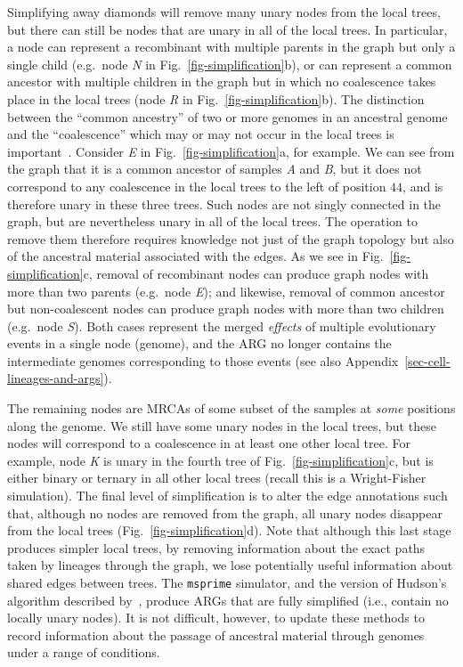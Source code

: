 \documentclass[9pt,twocolumn,twoside]{gsajnl}
\newcommand{\noderef}[1]{\textit{#1}}
\begin{document}
Simplifying away diamonds will remove many unary nodes from the
local trees, but there can still be nodes that are unary in all
of the local trees. In particular, a node can represent a recombinant
with multiple parents in the graph but only a single child (e.g.\ node \noderef{N}
in Fig.~\ref{fig-simplification}b), or can represent a common ancestor with
multiple children in the graph but in which no coalescence takes place
in the local trees
(node \noderef{R} in Fig.~\ref{fig-simplification}b).
The distinction between the ``common ancestry'' of two or more genomes
in an ancestral genome and the ``coalescence'' which may or may
not occur in the local trees is
important~\citep{hudson1983testing,kelleher2016efficient}.
Consider \noderef{E} in Fig.~\ref{fig-simplification}a,
for example. We can see from the graph that it is a common
ancestor of samples \noderef{A} and \noderef{B}, but
it does not correspond to any coalescence in the
local trees to the left of position $44$, and is therefore
unary in these three trees.
Such nodes are not singly connected in the graph, but are nevertheless unary in
all of the local trees.
The operation to remove them
therefore requires knowledge not just of the graph topology but also of the
ancestral material associated with the edges.
As we see in Fig.~\ref{fig-simplification}c,
removal of recombinant nodes can produce graph nodes with
more than two parents (e.g.~node \noderef{E}); and likewise, removal of
common ancestor but non-coalescent nodes can produce graph nodes with
more than two children (e.g.~node \noderef{S}). Both cases represent the
merged
\emph{effects} of multiple evolutionary events in a single node (genome), and the
ARG no longer contains the intermediate genomes corresponding to
those events (see also Appendix~\ref{sec-cell-lineages-and-args}).

The remaining nodes are MRCAs of some subset of the samples
at \emph{some} positions along the genome. We still have
some unary nodes in the local trees, but these nodes will
correspond to a coalescence in at least one other
local tree. For example, node  \noderef{K} is unary in the fourth tree
of Fig.~\ref{fig-simplification}c, but is either binary
or ternary in all other local trees (recall this is a Wright-Fisher
simulation). The final level of simplification is to alter the edge annotations
such that, although no nodes are removed from the graph, all
unary nodes disappear from the local trees (Fig.~\ref{fig-simplification}d).
Note that although this last stage produces simpler local trees, by
removing information about the exact paths taken by lineages through
the graph, we lose potentially useful information about shared edges
between trees.
The \texttt{msprime} simulator, and the version of Hudson's algorithm described
by~\citet{kelleher2016efficient}, produce ARGs
that are fully simplified (i.e., contain no locally unary nodes).
It is not difficult, however, to update
these methods to record information about the passage of ancestral
material through genomes under a range of conditions.
\end{document}
